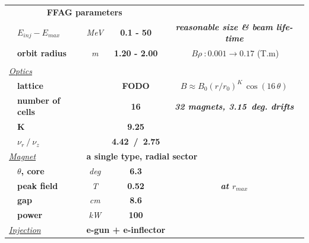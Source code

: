 \documentclass[12pt]{article}
\begin{document}
{\begin{minipage}[b]{.38\linewidth}
\end{minipage}\hspace{0mm}
\begin{minipage}[b]{.65\linewidth}
\large   
  \begin{center}
   \begin{tabular}{llccc}
\\[-3mm]
\multicolumn{4}{c}{\bf FFAG parameters}    &     \\[2mm]
      & \bf $E_{inj} - E_{max}$  & \it     MeV  & \bf    0.1 - 50     & \bf     \it reasonable size \& beam life-time         \\
      & \bf orbit radius& \it  m   & \bf     1.20 - 2.00    & $\ B\rho\ : 0.001 \rightarrow 0.17$ (T.m)    \\    \\[0ex]
\multicolumn{2}{l}{\it \underline{Optics}}   \\
      & \bf  lattice    &       & \bf    FODO            & \it $B\approx B_0(r/r_0)^K\, \cos(16\, \theta)$    \\
      & \bf  number of cells&   & \bf      16            & \bf      \it 32 magnets, 3.15~deg. drifts     \\
      & \bf    K        &       & \bf       9.25         & \bf             \\
      & \bf $\nu_r~/~\nu_z$&    & \bf     4.42~/~2.75    & \bf         \\[.5ex]
\multicolumn{2}{l}{\it  \underline{Magnet}}  & \multicolumn{3}{l}{\bf  a single type, radial sector }\\
& \bf    $\theta$, core & \it  deg & \bf         6.3       & \bf           \\ 
      & \bf  peak field & \it  T   & \bf        0.52       & \bf    \it  at $ r_{max}$       \\
      & \bf    gap      & \it  cm  & \bf        8.6        & \bf                    \\
      & \bf   power     & \it  kW  & \bf        100        & \bf              \\[1ex]
\multicolumn{2}{l}{\it  \underline{Injection}}& \multicolumn{3}{l}{\bf e-gun + e-inflector} \\[2ex]

\end{tabular}
\end{center}
\end{minipage}}
\end{document}
